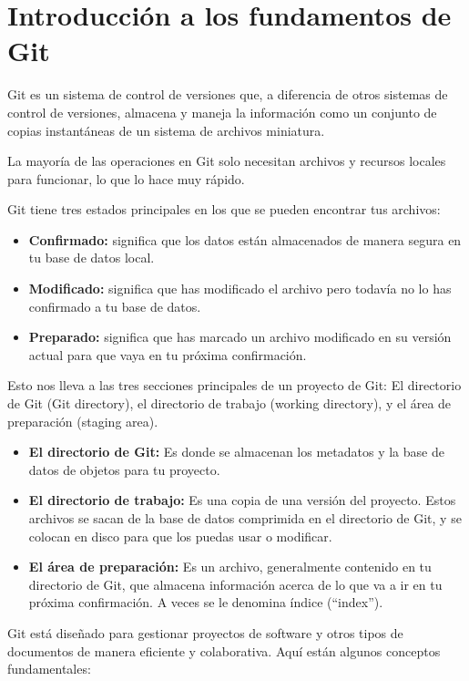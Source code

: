 \documentclass[
]{book}
\begin{document}
\section{Introducción a los fundamentos de Git}\label{introducciuxf3n-a-los-fundamentos-de-git}

Git es un sistema de control de versiones que, a diferencia de otros sistemas de control de versiones, almacena y maneja la información como un conjunto de copias instantáneas de un sistema de archivos miniatura.

La mayoría de las operaciones en Git solo necesitan archivos y recursos locales para funcionar, lo que lo hace muy rápido.

Git tiene tres estados principales en los que se pueden encontrar tus archivos:

\begin{itemize}
\item
  \textbf{Confirmado:} significa que los datos están almacenados de manera segura en tu base de datos local.
\item
  \textbf{Modificado:} significa que has modificado el archivo pero todavía no lo has confirmado a tu base de datos.
\item
  \textbf{Preparado:} significa que has marcado un archivo modificado en su versión actual para que vaya en tu próxima confirmación.
\end{itemize}

Esto nos lleva a las tres secciones principales de un proyecto de Git: El directorio de Git (Git directory), el directorio de trabajo (working directory), y el área de preparación (staging area).

\begin{itemize}
\item
  \textbf{El directorio de Git:} Es donde se almacenan los metadatos y la base de datos de objetos para tu proyecto.
\item
  \textbf{El directorio de trabajo:} Es una copia de una versión del proyecto. Estos archivos se sacan de la base de datos comprimida en el directorio de Git, y se colocan en disco para que los puedas usar o modificar.
\item
  \textbf{El área de preparación:} Es un archivo, generalmente contenido en tu directorio de Git, que almacena información acerca de lo que va a ir en tu próxima confirmación. A veces se le denomina índice (``index'').
\end{itemize}

Git está diseñado para gestionar proyectos de software y otros tipos de documentos de manera eficiente y colaborativa. Aquí están algunos conceptos fundamentales:
\end{document}
